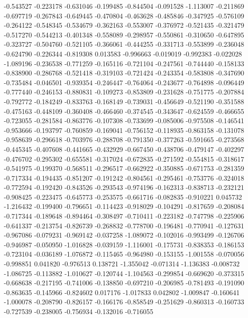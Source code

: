 -0.543527
-0.223178
-0.631046
-0.199485
-0.844504
-0.091528
-1.113007
-0.211869
-0.697719
-0.267843
-0.649445
-0.470804
-0.463628
-0.485846
-0.347925
-0.576109
-0.264122
-0.548345
-0.534679
-0.362163
-0.553007
-0.376972
-0.521435
-0.321479
-0.517270
-0.544213
-0.401348
-0.558089
-0.298957
-0.550861
-0.310650
-0.647895
-0.323727
-0.504760
-0.521105
-0.366061
-0.444255
-0.331713
-0.553899
-0.236048
-0.624790
-0.226344
-0.819308
0.013583
-0.996663
-0.019019
-0.992383
-0.022028
-1.089196
-0.236538
-0.771259
-0.165116
-0.721104
-0.247561
-0.744440
-0.158133
-0.838900
-0.286768
-0.521418
-0.319103
-0.721424
-0.243354
-0.583808
-0.347690
-0.735484
-0.046501
-0.939354
-0.246447
-0.764064
-0.243677
-0.764898
-0.096449
-0.777440
-0.246153
-0.880831
-0.109273
-0.853809
-0.231628
-0.751775
-0.207884
-0.792772
-0.184249
-0.833763
-0.168149
-0.739031
-0.456649
-0.521190
-0.351588
-0.475163
-0.448109
-0.360408
-0.466460
-0.374545
-0.343647
-0.624559
-0.466655
-0.723055
-0.281584
-0.863776
-0.107308
-0.733699
-0.085006
-0.975508
-0.146541
-0.953666
-0.193797
-0.760859
-0.169041
-0.756152
-0.118935
-0.863158
-0.131078
-0.958639
-0.296618
-0.703976
-0.288708
-0.791350
-0.377263
-0.591665
-0.273568
-0.445345
-0.407608
-0.441665
-0.432929
-0.667450
-0.438706
-0.479147
-0.402297
-0.476702
-0.295302
-0.655581
-0.317024
-0.672835
-0.271592
-0.554815
-0.318617
-0.541975
-0.199370
-0.568511
-0.296517
-0.662922
-0.350885
-0.671753
-0.281359
-0.717334
-0.194435
-0.851207
-0.191242
-0.804561
-0.295461
-0.753776
-0.324018
-0.772594
-0.192420
-0.843526
-0.293543
-0.974196
-0.162313
-0.838713
-0.232121
-0.908425
-0.223475
-0.645773
-0.253575
-0.661716
-0.082835
-0.910221
0.045732
-1.216432
-0.199400
-0.796651
-0.114423
-0.918029
-0.104291
-0.817659
-0.208084
-0.717344
-0.189648
-0.894464
-0.308497
-0.710411
-0.223182
-0.747798
-0.225906
-0.641337
-0.213754
-0.826739
-0.268832
-0.778700
-0.196481
-0.770941
-0.127631
-0.967086
-0.079231
-0.969142
-0.037258
-1.089072
-0.102016
-0.993499
-0.126706
-0.946987
-0.050950
-1.016828
-0.039159
-1.116001
-0.175731
-0.838353
-0.186153
-0.723104
-0.036189
-1.076872
-0.115465
-0.964980
-0.153155
-1.001558
-0.070056
-0.998851
0.041820
-0.976513
0.138721
-1.355042
-0.071314
-1.136383
-0.008732
-1.086725
-0.113882
-1.010627
-0.120744
-1.104563
-0.299854
-0.669620
-0.373315
-0.668638
-0.217195
-0.741006
-0.138850
-0.697210
-0.206985
-0.781493
-0.191090
-0.863635
-0.145966
-0.824602
0.017176
-1.017833
0.042802
-1.009847
-0.160641
-1.000078
-0.208790
-0.826157
-0.166176
-0.858549
-0.251629
-0.860313
-0.160733
-0.727539
-0.238005
-0.756934
-0.132016
-0.716055
